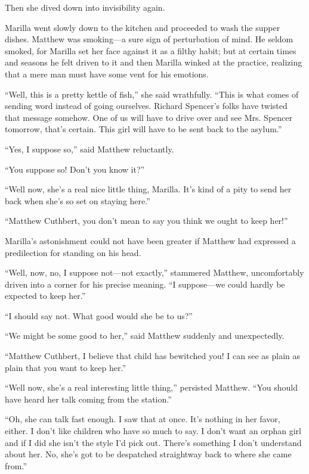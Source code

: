 \documentclass[a4paper]{article}
\begin{document}
Then she dived down into invisibility again.

Marilla went slowly down to the kitchen and proceeded to wash the supper dishes. Matthew was smoking---a sure sign of perturbation of mind. He seldom smoked, for Marilla set her face against it as a filthy habit; but at certain times and seasons he felt driven to it and then Marilla winked at the practice, realizing that a mere man must have some vent for his emotions.

``Well, this is a pretty kettle of fish,'' she said wrathfully. ``This is what comes of sending word instead of going ourselves. Richard Spencer's folks have twisted that message somehow. One of us will have to drive over and see Mrs. Spencer tomorrow, that's certain. This girl will have to be sent back to the asylum.''

``Yes, I suppose so,'' said Matthew reluctantly.

``You suppose so! Don't you know it?''

``Well now, she's a real nice little thing, Marilla. It's kind of a pity to send her back when she's so set on staying here.''

``Matthew Cuthbert, you don't mean to say you think we ought to keep her!''

Marilla's astonishment could not have been greater if Matthew had expressed a predilection for standing on his head.

``Well, now, no, I suppose not---not exactly,'' stammered Matthew, uncomfortably driven into a corner for his precise meaning. ``I suppose---we could hardly be expected to keep her.''

``I should say not. What good would she be to us?''

``We might be some good to her,'' said Matthew suddenly and unexpectedly.

``Matthew Cuthbert, I believe that child has bewitched you! I can see as plain as plain that you want to keep her.''

\tiny{``Well now, she's a real interesting little thing,'' persisted Matthew. ``You should have heard her talk coming from the station.''}

``Oh, she can talk fast enough. I saw that at once. It's nothing in her favor, either. I don't like children who have so much to say. I don't want an orphan girl and if I did she isn't the style I'd pick out. There's something I don't understand about her. No, she's got to be despatched straightway back to where she came from.''
\end{document}
